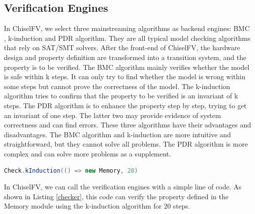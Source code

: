\documentclass[conference]{IEEEtran}
\theoremstyle{definition}
\begin{document}
\subsection{Verification Engines}
In ChiselFV, we select three mainstreaming algorithms as backend engines: BMC \cite{biere1999symbolic}, k-induction \cite{sheeran2000checking} and PDR \cite{bradley2011sat} algorithm. 
They are all typical model checking algorithms that rely on SAT/SMT solvers. After the front-end of ChiselFV, the hardware design and property definition are transformed into a transition system, and the property is to be verified. The BMC algorithm mainly verifies whether the model is safe within k steps. It can only try to find whether the model is wrong within some steps but cannot prove the correctness of the model. The k-induction algorithm tries to confirm that the property to be verified is an invariant of k steps. The PDR algorithm is to enhance the property step by step, trying to get an invariant of one step. The latter two may provide evidence of system correctness and can find errors. These three algorithms have their advantages and disadvantages. The BMC algorithm and k-induction are more intuitive and straightforward, but they cannot solve all problems. The PDR algorithm is more complex and can solve more problems as a supplement.

\begin{lstlisting}[language=scala, caption={A Code Clip to Call Formal Verification}, label=checker]
Check.kInduction(() => new Memory, 20)
\end{lstlisting}

In ChiselFV, we can call the verification engines with a simple line of code. As shown in Listing \ref{checker}, this code can verify the property defined in the Memory module using the k-induction algorithm for 20 steps.
\end{document}
